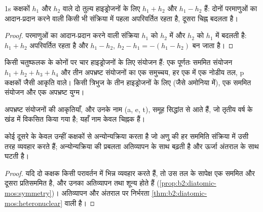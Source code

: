 \begin{proposition}[दो हाइड्रोजन]\label{prop:b2:fragment-orbitals:h2-pair}
1s कक्षकों $h_1$ और $h_2$ वाले दो तुल्य हाइड्रोजनों के लिए
 $h_1 + h_2$ और $h_1 - h_2$ हैं: दोनों परमाणुओं का आदान-प्रदान करने वाली
किसी भी संक्रिया में पहला अपरिवर्तित रहता है, दूसरा चिह्न बदलता है।
\end{proposition}

\begin{proof}
परमाणुओं का आदान-प्रदान करने वाली संक्रिया $h_1$ को $h_2$ में और $h_2$ को
$h_1$ में बदलती है: $h_1 + h_2$ अपरिवर्तित रहता है और $h_1 - h_2$, $h_2 - h_1 = -(h_1 - h_2)$ बन जाता है।
\end{proof}

\begin{proposition}[तीन और चार हाइड्रोजन]\label{prop:b2:fragment-orbitals:h4}
किसी चतुष्फलक के कोनों पर चार हाइड्रोजनों के लिए संयोजन हैं: एक
पूर्णतः सममित संयोजन $h_1 + h_2 + h_3 + h_4$ और तीन अपभ्रष्ट
संयोजनों का एक समुच्चय, हर एक में एक नोडीय तल, p कक्षकों जैसी आकृति वाले। किसी त्रिभुज के तीन
हाइड्रोजनों के लिए (जैसे अमोनिया में), एक सममित संयोजन और एक
अपभ्रष्ट युग्म।
\end{proposition}

\admitted

अपभ्रष्ट संयोजनों की आकृतियाँ, और उनके नाम (a, e, t), समूह सिद्धांत से आते हैं,
जो तृतीय वर्ष के खंड में विकसित किया गया है; यहाँ नाम केवल चिह्नक हैं।

\begin{proposition}[केवल समान, समान से अन्योन्यक्रिया करता है]\label{prop:b2:fragment-orbitals:interaction-rules}
कोई  दूसरे  के केवल उन्हीं कक्षकों से अन्योन्यक्रिया करता है जो
अणु की हर सममिति संक्रिया में उसी तरह व्यवहार करते हैं; अन्योन्यक्रिया की
प्रबलता अतिव्यापन के साथ बढ़ती है और ऊर्जा अंतराल के साथ
घटती है।
\end{proposition}

\begin{proof}
यदि दो कक्षक किसी परावर्तन में भिन्न व्यवहार करते हैं, तो उस तल के सापेक्ष एक सममित और
दूसरा प्रतिसममित है, और उनका अतिव्यापन तथा
 शून्य होते हैं (\cref{prop:b2:diatomic-mos:symmetry})। अतिव्यापन और
अंतराल पर निर्भरता \cref{thm:b2:diatomic-mos:heteronuclear} वाली है।
\end{proof}

